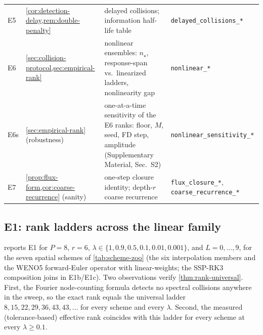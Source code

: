 \documentclass[pdflatex,sn-mathphys-num]{sn-jnl}%
\theoremstyle{thmstyleone}%
\theoremstyle{thmstyletwo}%
\theoremstyle{thmstylethree}%
\begin{document}
\begin{table}[htbp]
\begin{tabular}{@{}l
>{\raggedright\arraybackslash}p{88pt}
>{\raggedright\arraybackslash}p{190pt}
>{\raggedright\arraybackslash}p{102pt}@{}}
E5  & \cref{cor:detection-delay,rem:double-penalty}                               & delayed collisions; information half-life table                                                                   & \texttt{delayed\_collisions\_*}                           \\
E6  & \cref{sec:collision-protocol,sec:empirical-rank}                            & nonlinear ensembles: $n_\star$, response-span vs.\ linearized ladders, nonlinearity gap                           & \texttt{nonlinear\_*}                                     \\
E6s & \cref{sec:empirical-rank} (robustness)                                      & one-at-a-time sensitivity of the E6 ranks: floor, $M$, seed, FD step, amplitude (Supplementary Material, Sec.~S2) & \texttt{nonlinear\_sensitivity\_*}                        \\
E7  & \cref{prop:flux-form,cor:coarse-recurrence} (sanity)                        & one-step closure identity; depth-$r$ coarse recurrence                                                            & \texttt{flux\_closure\_*}, \texttt{coarse\_recurrence\_*} \\
\bottomrule
\end{tabular}
\end{table}

\subsection{E1: rank ladders across the linear family}\label{sec:exp-rank}

 reports E1 for $P=8$, $r=6$, $\lambda\in\{1,0.9,0.5,0.1,0.01,0.001\}$, and $L=0,\ldots,9$, for the seven spatial schemes of \cref{tab:scheme-zoo} (the six interpolation members and the WENO5 forward-Euler operator with linear-weights; the SSP-RK3 composition joins in E1b/E1c).
Two observations verify \cref{thm:rank-universal}.
First, the Fourier node-counting formula detects no spectral collisions anywhere in the sweep, so the exact rank equals the universal ladder $8,15,22,29,36,43,43,\ldots$ for every scheme and every $\lambda$.
Second, the measured (tolerance-based) effective rank coincides with this ladder for every scheme at every $\lambda\ge0.1$.
\end{document}
